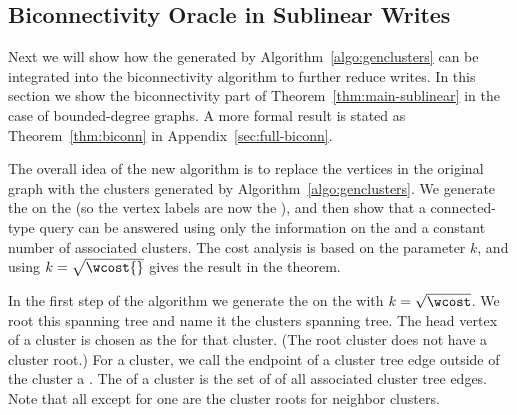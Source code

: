 \subsection{Biconnectivity Oracle in Sublinear Writes}
\label{sec:abstract-bcc-sublinear}

Next we will show how the \implicit{} generated by Algorithm~\ref{algo:genclusters} can be integrated into the biconnectivity algorithm to further reduce writes.
In this section we show the biconnectivity part of Theorem~\ref{thm:main-sublinear} in the case of bounded-degree graphs.  
A more formal result is stated as Theorem~\ref{thm:biconn} in Appendix~\ref{sec:full-biconn}.

The overall idea of the new algorithm is to replace the vertices in the original graph with the clusters generated by Algorithm~\ref{algo:genclusters}.  We generate the \imprep{} on the \clustergraph{} (so the vertex labels are now the ), and then show that a connected-type query can be answered using only the information on the \clustergraph{} and a constant number of associated clusters.
The cost analysis is based on the parameter $k$, and using $k=\sqrt{\wcost{}}$ gives the result in the theorem.


In the first step of the algorithm we generate the \imprep{} on the \clustergraph{}
with $k=\sqrt{\wcost}$.  We root this spanning tree and name it
the clusters spanning tree.
The head vertex of a cluster is chosen as the  for that cluster. (The root cluster does not have a cluster root.)
For a cluster, we call the endpoint of a cluster tree edge outside of the cluster a .
The  of a cluster is the set of \outvers{}
of all associated cluster tree edges.  Note that all \outvers{} except
for one are the cluster roots for
neighbor clusters.

